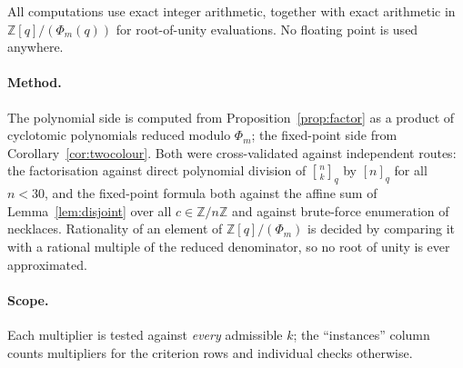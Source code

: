 \documentclass[11pt,a4paper]{article}
\theoremstyle{plain}
\theoremstyle{definition}
\theoremstyle{remark}
\newcommand{\Z}{\mathbb{Z}}
\newcommand{\Zn}{\Z/n\Z}
\newcommand{\qint}[1]{[#1]_q}
\newcommand{\qbin}[2]{\genfrac[]{0pt}{}{#1}{#2}_{q}}
\begin{document}
All computations use exact integer arithmetic, together with exact arithmetic in
$\Z[q]/(\Phi_m(q))$ for root-of-unity evaluations. No floating point is used anywhere.

\paragraph{Method.} The polynomial side is computed from Proposition~\ref{prop:factor} as a
product of cyclotomic polynomials reduced modulo $\Phi_m$; the fixed-point side from
Corollary~\ref{cor:twocolour}. Both were cross-validated against independent routes: the
factorisation against direct polynomial division of $\qbin{n}{k}$ by $\qint{n}$ for all
$n<30$, and the fixed-point formula both against the affine sum of Lemma~\ref{lem:disjoint}
over all $c\in\Zn$ and against brute-force enumeration of necklaces. Rationality of an
element of $\Z[q]/(\Phi_m)$ is decided by comparing it with a rational multiple of the
reduced denominator, so no root of unity is ever approximated.

\paragraph{Scope.} Each multiplier is tested against \emph{every} admissible $k$; the
``instances'' column counts multipliers for the criterion rows and individual checks
otherwise.
\end{document}
